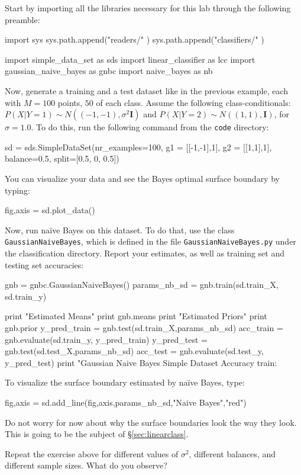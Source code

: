 \begin{exercise}\label{exer:simplenb}

\begin{enumerate}
Start by importing all the libraries necessary for this lab through the following preamble: 
\begin{python}
import sys
sys.path.append("readers/" )
sys.path.append("classifiers/" )

import simple_data_set as sds
import linear_classifier as lcc
import gaussian_naive_bayes as gnbc
import naive_bayes as nb
\end{python}

Now, generate a training and a test dataset like in the previous example, each with $M=100$ points, $50$ of each class. 
Assume the following class-conditionals: 
$P(X|Y=1) \sim N((-1,-1), \sigma^2 \boldsymbol{I})$ and $P(X|Y=2) \sim
N((1,1), \boldsymbol{I})$, for $\sigma = 1.0$. 
To do this, run the following command from the {\tt code} directory:

\begin{python}
sd = sds.SimpleDataSet(nr_examples=100, g1 = [[-1,-1],1], g2 = [[1,1],1], balance=0.5, split=[0.5, 0, 0.5])
\end{python}

You can visualize your data and see the Bayes optimal surface boundary by typing: 
\begin{python}
fig,axis = sd.plot_data()
\end{python}

Now, run na\"ive Bayes on this dataset. To do that, use the class {\tt GaussianNaiveBayes}, 
which is defined in the file {\tt GaussianNaiveBayes.py} under the
classification directory. 
Report your estimates, as well as training set and testing set
accuracies:

\begin{python}
gnb = gnbc.GaussianNaiveBayes()
params_nb_sd = gnb.train(sd.train_X, sd.train_y)

print "Estimated Means"
print gnb.means
print "Estimated Priors"
print gnb.prior
y_pred_train = gnb.test(sd.train_X,params_nb_sd)
acc_train = gnb.evaluate(sd.train_y, y_pred_train)
y_pred_test = gnb.test(sd.test_X,params_nb_sd)
acc_test = gnb.evaluate(sd.test_y, y_pred_test)
print "Gaussian Naive Bayes Simple Dataset Accuracy train: %
\end{python}

To visualize the surface boundary estimated by na\"ive Bayes, type: 
\begin{python}
fig,axis = sd.add_line(fig,axis,params_nb_sd,"Naive Bayes","red")
\end{python}
Do not worry for now about why the surface boundaries look the way they look. This is going to be the subject of \S\ref{sec:linearclass}. 


Repeat the exercise above for different values of $\sigma^2$, different balances, and different sample sizes. What do you observe? 

\end{enumerate}
\end{exercise}


